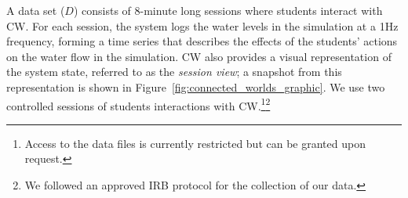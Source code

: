 \documentclass[letterpaper]{article} %
\begin{document}
A data set ($D$) consists of 8-minute long sessions where students interact with CW. 
For each session, the system logs the water levels in the simulation at a 1Hz frequency, forming a time series that describes the effects of the students' actions on the water flow in the simulation.  
CW also provides 
a visual representation of the system state, referred to as the \emph{session view}; a snapshot from this representation is shown in Figure~\ref{fig:connected_worlds_graphic}.
We use two controlled sessions of students interactions with CW.\footnote{Access to the data files is currently restricted but can be granted upon request.}\footnote{We followed an approved IRB protocol for the collection of our data.}




\end{document}
